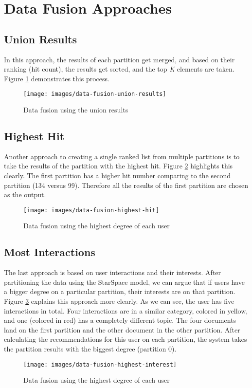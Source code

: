\section{Data Fusion Approaches}
\label{sec:data-fusion-approaches}

\subsection{Union Results}
\label{subsec:data-fusion-union-results}
In this approach, the results of each partition get merged, and based on their ranking (hit count), the results get sorted, and the top \emph{K} elements are taken. Figure \ref{fig:data-fusion-union-results} demonstrates this process.


\begin{figure}[!h]
	\centering
	\texttt{[image: images/data-fusion-union-results]}
	\caption{Data fusion using the union results}
	\label{fig:data-fusion-union-results}
\end{figure}

\subsection{Highest Hit}
\label{subsec:data-fusion-highest-hit}
Another approach to creating a single ranked list from multiple partitions is to take the results of the partition with the highest hit. Figure \ref{fig:data-fusion-highest-hit} highlights this clearly. The first partition has a higher hit number comparing to the second partition (134 versus 99). Therefore all the results of the first partition are chosen as the output.
\begin{figure}[!h]
	\centering
	\texttt{[image: images/data-fusion-highest-hit]}
	\caption{Data fusion using the highest degree of each user}
	\label{fig:data-fusion-highest-hit}
\end{figure}

\subsection{Most Interactions}
\label{subsec:data-fusion-most-interactions}
The last approach is based on user interactions and their interests. After partitioning the data using the StarSpace model, we can argue that if users have a bigger degree on a particular partition, their interests are on that partition. Figure \ref{fig:data-fusion-highest-ineterest} explains this approach more clearly. As we can see, the user has five interactions in total. Four interactions are in a similar category, colored in yellow, and one (colored in red) has a completely different topic. The four documents land on the first partition and the other document in the other partition. After calculating the recommendations for this user on each partition, the system takes the partition results with the biggest degree (partition 0).
\begin{figure}[!h]
	\centering
	\texttt{[image: images/data-fusion-highest-interest]}
	\caption{Data fusion using the highest degree of each user}
	\label{fig:data-fusion-highest-ineterest}
\end{figure}

